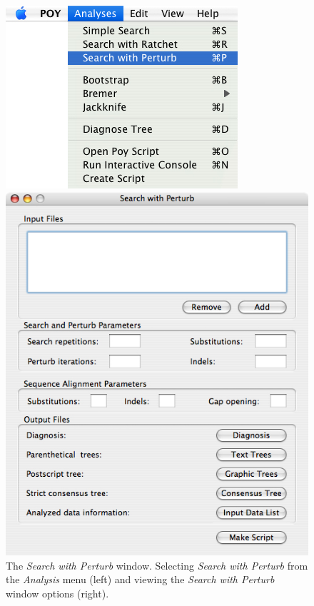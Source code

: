 \begin{figure}
\centering
\begin{minipage}[c]{0.48\textwidth}
   		\includegraphics[width=\textwidth]{figures/searchwithperturb_menu.jpg}
\end{minipage}
\quad
\begin{minipage}[c]{0.48\textwidth}
	   	\includegraphics[width=\textwidth]{figures/searchwithperturb_window.jpg}
   	\end{minipage} 
\caption{The \emph{Search with Perturb} window. Selecting \emph{Search with Perturb} from the \emph{Analysis} menu (left) and viewing the \emph{Search with Perturb} window options (right).}
\label{fig:search_with_perturb_window}
\end{figure}

